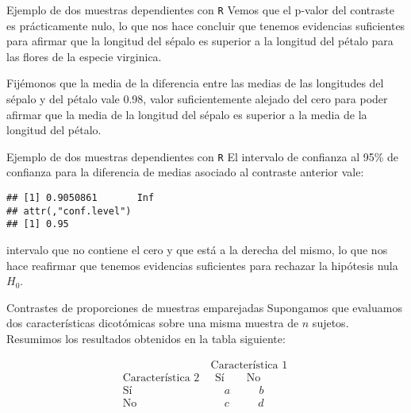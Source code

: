 \documentclass[
  ignorenonframetext,
]{beamer}
\newenvironment{Shaded}{\begin{snugshade}}{\end{snugshade}}
\newcommand{\DataTypeTok}[1]{\textcolor[rgb]{0.13,0.29,0.53}{#1}}
\newcommand{\KeywordTok}[1]{\textcolor[rgb]{0.13,0.29,0.53}{\textbf{#1}}}
\newcommand{\NormalTok}[1]{#1}
\newcommand{\OperatorTok}[1]{\textcolor[rgb]{0.81,0.36,0.00}{\textbf{#1}}}
\newcommand{\OtherTok}[1]{\textcolor[rgb]{0.56,0.35,0.01}{#1}}
\newcommand{\StringTok}[1]{\textcolor[rgb]{0.31,0.60,0.02}{#1}}
\begin{document}
\begin{frame}{Ejemplo de dos muestras dependientes con \texttt{R}}
\protect\hypertarget{ejemplo-de-dos-muestras-dependientes-con-r-3}{}
Vemos que el p-valor del contraste es prácticamente nulo, lo que nos
hace concluir que tenemos evidencias suficientes para afirmar que la
longitud del sépalo es superior a la longitud del pétalo para las flores
de la especie virginica.

Fijémonos que la media de la diferencia entre las medias de las
longitudes del sépalo y del pétalo vale 0.98, valor suficientemente
alejado del cero para poder afirmar que la media de la longitud del
sépalo es superior a la media de la longitud del pétalo.
\end{frame}

\begin{frame}[fragile]{Ejemplo de dos muestras dependientes con
\texttt{R}}
\protect\hypertarget{ejemplo-de-dos-muestras-dependientes-con-r-4}{}
El intervalo de confianza al 95\% de confianza para la diferencia de
medias asociado al contraste anterior vale:

\begin{Shaded}
\end{Shaded}

\begin{verbatim}
## [1] 0.9050861       Inf
## attr(,"conf.level")
## [1] 0.95
\end{verbatim}

intervalo que no contiene el cero y que está a la derecha del mismo, lo
que nos hace reafirmar que tenemos evidencias suficientes para rechazar
la hipótesis nula \(H_0\).
\end{frame}

\begin{frame}{Contrastes de proporciones de muestras emparejadas}
\protect\hypertarget{contrastes-de-proporciones-de-muestras-emparejadas}{}
Supongamos que evaluamos dos características dicotómicas sobre una misma
muestra de \(n\) sujetos. Resumimos los resultados obtenidos en la tabla
siguiente:

\[
\begin{array}{r|c}
 & \ \mbox{Característica 1}\  \\
\mbox{Característica 2} &\ \ \, \mbox{Sí}\qquad \mbox{No}\\\hline
 \mbox{Sí} & \quad\ \  a \qquad \ \ \, b\quad  \\
 \mbox{No} & \quad\ \   c  \qquad \ \ \, d\quad
 \end{array}
\]
\end{frame}
\end{document}
